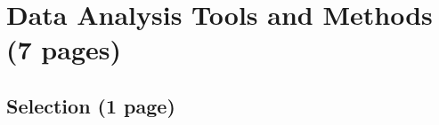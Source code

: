 
\chapter{Data Analysis Tools and Methods (7 pages)}
\label{sec:dataanalysis}

\section{Selection (1 page)}
\label{sec:dataanalysis:selection}









